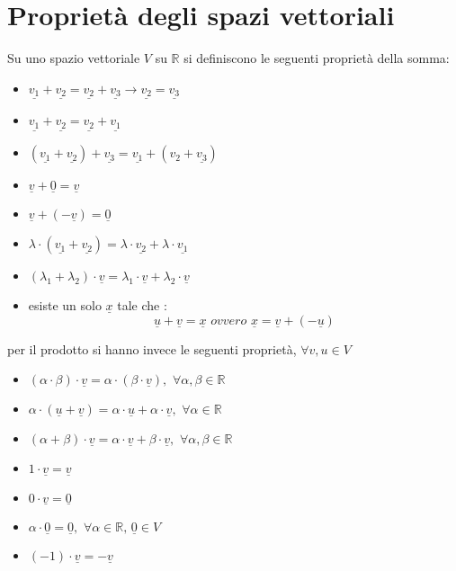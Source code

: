 \documentclass[a4paper,12pt, oneside]{book}
\begin{document}
\section{Proprietà degli spazi vettoriali}
Su uno spazio vettoriale $V$ su $\mathbb{R}$ si definiscono le seguenti proprietà della somma:
\begin{itemize}
\item $\underline{v_1}+\underline{v_2} = \underline{v_2}+\underline{v_3}\longrightarrow \underline{v_2}=\underline{v_3}$
\item $\underline{v_1}+\underline{v_2} = \underline{v_2}+\underline{v_1}$
\item $(\underline{v_1}+\underline{v_2})+\underline{v_3}=\underline{v_1}+(v_2+\underline{v_3})$
\item $\underline{v}+\underline{0}=\underline{v}$
\item $\underline{v}+(-\underline{v})=\underline{0}$
\item $\lambda\cdot(\underline{v_1}+\underline{v_2} )=\lambda\cdot \underline{v_2}+\lambda\cdot\underline{v_1}$
\item $(\lambda_1+\lambda_2)\cdot \underline{v}=\lambda_1\cdot \underline{v}+\lambda_2\cdot \underline{v}$
\item esiste un solo $\underline{x}$ tale che :
$$\underline{u}+\underline{v}=\underline{x}\,\, ovvero \,\, \underline{x}=\underline{v}+(-\underline{u})$$
\end{itemize}
per il prodotto si hanno invece le seguenti proprietà, $\forall v,u\in V$
\begin{itemize}
\item $(\alpha\cdot \beta)\cdot \underline{v}=\alpha\cdot (\beta\cdot \underline{v}),\,\, \forall\alpha,\beta \in \mathbb{R}$
\item $\alpha\cdot (\underline{u}+\underline{v})=\alpha\cdot \underline{u}+\alpha\cdot \underline{v},\,\,\forall\alpha\in\mathbb{R}$
\item $(\alpha+\beta)\cdot\underline{v}=\alpha\cdot \underline{v}+\beta\cdot \underline{v},\,\,\forall \alpha,\beta\in\mathbb{R}$
\item $1\cdot \underline{v}=\underline{v}$
\item $0\cdot \underline{v}=\underline{0}$
\item $\alpha\cdot \underline{0}=\underline{0},\,\,\forall \alpha\in\mathbb{R},\, \underline{0}\in V$
\item $(-1)\cdot \underline{v}=-\underline{v}$
\end{itemize}
\end{document}

